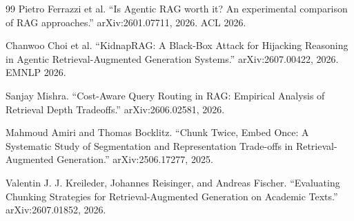 \begin{thebibliography}{99}
Pietro Ferrazzi et al.
``Is Agentic RAG worth it? An experimental comparison of RAG approaches.''
arXiv:2601.07711, 2026. ACL 2026.

Chanwoo Choi et al.
``KidnapRAG: A Black-Box Attack for Hijacking Reasoning in Agentic Retrieval-Augmented Generation Systems.''
arXiv:2607.00422, 2026. EMNLP 2026.

Sanjay Mishra.
``Cost-Aware Query Routing in RAG: Empirical Analysis of Retrieval Depth Tradeoffs.''
arXiv:2606.02581, 2026.

Mahmoud Amiri and Thomas Bocklitz.
``Chunk Twice, Embed Once: A Systematic Study of Segmentation and Representation
Trade-offs in Retrieval-Augmented Generation.''
arXiv:2506.17277, 2025.

Valentin J. J. Kreileder, Johannes Reisinger, and Andreas Fischer.
``Evaluating Chunking Strategies for Retrieval-Augmented Generation on Academic Texts.''
arXiv:2607.01852, 2026.
\end{thebibliography}


